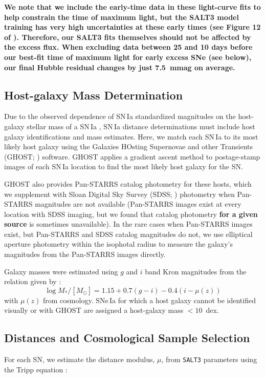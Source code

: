 \documentclass[twocolumn,twocolappendix, linenumbers]{aastex631} %
\begin{document}
{\bf We note that we include the early-time data in these light-curve fits to help constrain the time of maximum light, but the SALT3 model training has very high uncertainties at these early times (see Figure 12 of \citealp{Kenworthy21}).  Therefore, our SALT3 fits themselves should not be affected by the excess flux.  When excluding data between 25 and 10 days before our best-fit time of maximum light for early excess SNe (see below), our final Hubble residual changes by just 7.5~mmag on average.}

\subsection{Host-galaxy Mass Determination}

Due to the observed dependence of SN\,Ia standardized magnitudes on the host-galaxy stellar mass of a SN\,Ia \citep{Kelly10,Lampeitl10,Sullivan10}, SN\,Ia distance determinations must include host galaxy identifications and mass estimates.  Here, we match each SN\,Ia to its most likely host galaxy using the Galaxies HOsting Supernovae and other Transients (GHOST; \citealp{Gagliano21}) software.  GHOST applies a gradient ascent method to postage-stamp images of each SN\,Ia location to find the most likely host galaxy for the SN.

GHOST also provides Pan-STARRS catalog photometry \citep{Flewelling20} for these hosts, which we supplement with Sloan Digital Sky Survey (SDSS; \citealp{York00}) photometry when Pan-STARRS magnitudes are not available (Pan-STARRS images exist at every location with SDSS imaging, but we found that catalog photometry {\bf for a given source} is sometimes unavailable).  In the rare cases when Pan-STARRS images exist, but Pan-STARRS and SDSS catalog magnitudes do not, we use elliptical aperture photometry within the isophotal radius to measure the galaxy's magnitudes from the Pan-STARRS images directly.

Galaxy masses were estimated using $g$ and $i$ band Kron magnitudes from the relation given by \citet{Taylor11}: 
\begin{equation}
    \log M_{*}/[M_\odot]  = 1.15 + 0.7(g - i) - 0.4(i - \mu(z))
\end{equation}
with $\mu(z)$ from \citet{Planck18} cosmology.  SNe\,Ia for which a host galaxy cannot be identified visually or with GHOST are assigned a host-galaxy mass $< 10$~dex.

\subsection{Distances and Cosmological Sample Selection} \label{sample}
For each SN, we estimate the distance modulus, $\mu$, from \texttt{SALT3} parameters using the Tripp equation \citep{Tripp98}:
\end{document}
